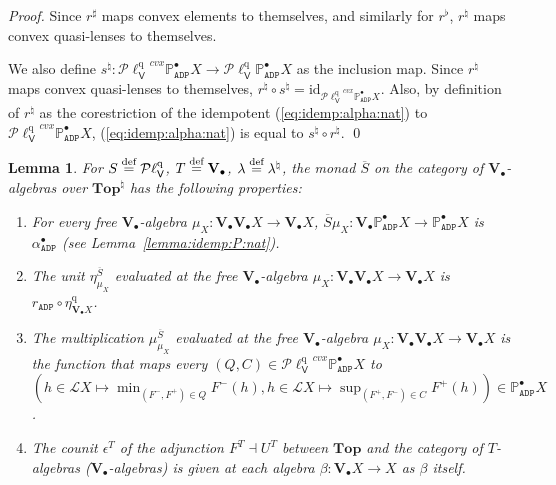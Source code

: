 \documentclass[preprint,12pt]{elsarticle}
\newcommand\eqdef{\mathrel{\buildrel \text{def}\over=}}
\newcommand\Lform{\mathcal L}
\newcommand\identity[1]{\mathrm{id}_{#1}}
\newcommand\Pred{\mathbb{P}}
\newcommand\Angel{{\mathtt{A}}}
\newcommand\Demon{{\mathtt{D}}}
\newcommand\Nature{{\mathtt{P}}}
\newcommand\AN{{\Angel\Nature}}
\newcommand\ADN{{\Angel\Demon\Nature}}
\newcommand\Hoare{{\mathcal H}}
\newcommand\Vt{\mathsf{V}}
\newcommand\HV{\Hoare_\Vt}
\newcommand\quasi{\mathrm{q}} %
\newcommand\QL{\Plotkin^\quasi}
\newcommand\QLV{\QL_\Vt}
\newcommand\Plotkin{\mathcal P\ell} %
\newcommand\Val{{\mathbf V}}
\newcommand\Topcat{\mathbf{Top}}
\newtheorem{lemma}[theorem]{Lemma}
\begin{document}
\begin{proof}
  Since $r^\sharp$ maps convex elements to themselves, and similarly
  for $r^\flat$, $r^\natural$ maps convex quasi-lenses to themselves.

  We also define
  $s^\natural \colon {\QLV}^{cvx} {\Pred_\ADN^\bullet X} \to \QLV
  {\Pred_\ADN^\bullet X}$ as the inclusion map.  Since $r^\natural$
  maps convex quasi-lenses to themselves,
  $r^\natural \circ s^\natural = \identity {{\QLV}^{cvx}
    {\Pred_\ADN^\bullet X}}$.  Also, by definition of $r^\natural$ as
  the corestriction of the idempotent (\ref{eq:idemp:alpha:nat}) to
  ${\QLV}^{cvx} {\Pred_\ADN^\bullet X}$, (\ref{eq:idemp:alpha:nat}) is
  equal to $s^\natural \circ r^\natural$.  \qed
\end{proof}

\begin{lemma}
  \label{lemma:Sbar:nat}
  For $S \eqdef \QLV$, $T \eqdef \Val_\bullet$,
  $\lambda \eqdef \lambda^\natural$, the monad $\overline S$ on the
  category of $\Val_\bullet$-algebras over $\Topcat^\natural$ has the
  following properties:
  \begin{enumerate}
  \item For every free $\Val_\bullet$-algebra
    $\mu_X \colon \Val_\bullet {\Val_\bullet X} \to \Val_\bullet X$,
    $\overline S \mu_X \colon \Val_\bullet {\Pred_\ADN^\bullet X} \to
    \Pred_\ADN^\bullet X$ is $\alpha_\ADN^\bullet$ (see
    Lemma~\ref{lemma:idemp:P:nat}).
  \item The unit $\eta^{\overline S}_{\mu_X}$ evaluated at the free
    $\Val_\bullet$-algebra
    $\mu_X \colon \Val_\bullet {\Val_\bullet X} \to \Val_\bullet X$ is
    $r_\ADN \circ \eta^\quasi_{\Val_\bullet X}$.
  \item The multiplication $\mu^{\overline S}_{\mu_X}$ evaluated at
    the free $\Val_\bullet$-algebra
    $\mu_X \colon \Val_\bullet {\Val_\bullet X} \to \Val_\bullet X$ is
    the function that maps every
    $(Q, C) \in {\QLV}^{cvx} {\Pred_\ADN^\bullet X}$ to
    $(h \in \Lform X \mapsto \min_{(F^-, F^+) \in Q} F^- (h), h \in
    \Lform X \mapsto \sup_{(F^+, F^-) \in C} F^+ (h)) \in
    \Pred_\ADN^\bullet X$.
  \item The counit $\epsilon^T$ of the adjunction $F^T \dashv U^T$
    between $\Topcat$ and the category of $T$-algebras
    ($\Val_\bullet$-algebras) is given at each algebra $\beta \colon
    \Val_\bullet X \to X$ as $\beta$ itself.
  \end{enumerate}
\end{lemma}
\end{document}
